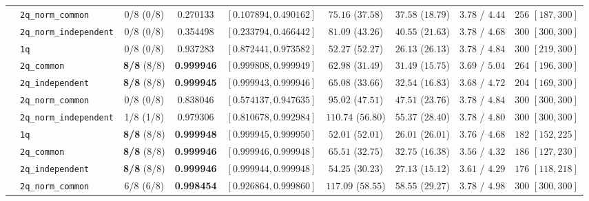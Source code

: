 \documentclass[11pt,a4paper]{article}
\begin{document}
\begin{table}[H]
{\begin{tabular}{llccccccc}
 & \texttt{2q\_norm\_common} & 0/8 (0/8) & 0.270133 & $[0.107894, 0.490162]$ & $75.16$ ($37.58$) & $37.58$ ($18.79$) & $3.78$ / $4.44$ & $256$ $[187, 300]$ \\
 & \texttt{2q\_norm\_independent} & 0/8 (0/8) & 0.354498 & $[0.233794, 0.466442]$ & $81.09$ ($43.26$) & $40.55$ ($21.63$) & $3.78$ / $4.68$ & $300$ $[300, 300]$ \\
\midrule
{}
 & \texttt{1q} & 0/8 (0/8) & 0.937283 & $[0.872441, 0.973582]$ & $52.27$ ($52.27$) & $26.13$ ($26.13$) & $3.78$ / $4.84$ & $300$ $[219, 300]$ \\
 & \texttt{2q\_common} & \textbf{8/8} (8/8) & \textbf{0.999946} & $[0.999808, 0.999949]$ & $62.98$ ($31.49$) & $31.49$ ($15.75$) & $3.69$ / $5.04$ & $264$ $[196, 300]$ \\
 & \texttt{2q\_independent} & \textbf{8/8} (8/8) & \textbf{0.999945} & $[0.999943, 0.999946]$ & $65.08$ ($33.66$) & $32.54$ ($16.83$) & $3.68$ / $4.72$ & $204$ $[169, 300]$ \\
 & \texttt{2q\_norm\_common} & 0/8 (0/8) & 0.838046 & $[0.574137, 0.947635]$ & $95.02$ ($47.51$) & $47.51$ ($23.76$) & $3.78$ / $4.84$ & $300$ $[300, 300]$ \\
 & \texttt{2q\_norm\_independent} & 1/8 (1/8) & 0.979306 & $[0.810678, 0.992984]$ & $110.74$ ($56.80$) & $55.37$ ($28.40$) & $3.78$ / $4.80$ & $300$ $[300, 300]$ \\
\midrule
{}
 & \texttt{1q} & \textbf{8/8} (8/8) & \textbf{0.999948} & $[0.999945, 0.999950]$ & $52.01$ ($52.01$) & $26.01$ ($26.01$) & $3.76$ / $4.68$ & $182$ $[152, 225]$ \\
 & \texttt{2q\_common} & \textbf{8/8} (8/8) & \textbf{0.999946} & $[0.999946, 0.999948]$ & $65.51$ ($32.75$) & $32.75$ ($16.38$) & $3.56$ / $4.32$ & $186$ $[127, 230]$ \\
 & \texttt{2q\_independent} & \textbf{8/8} (8/8) & \textbf{0.999946} & $[0.999944, 0.999948]$ & $54.25$ ($30.23$) & $27.13$ ($15.12$) & $3.61$ / $4.29$ & $176$ $[118, 218]$ \\
 & \texttt{2q\_norm\_common} & 6/8 (6/8) & \textbf{0.998454} & $[0.926864, 0.999860]$ & $117.09$ ($58.55$) & $58.55$ ($29.27$) & $3.78$ / $4.98$ & $300$ $[300, 300]$ \\

\end{tabular}}
\end{table}
\end{document}
